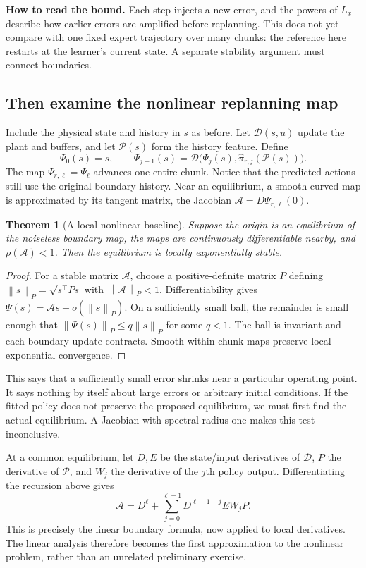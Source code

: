 \documentclass[12 pt]{article}        	%
\newtheorem{theorem}{Theorem}[section]
\theoremstyle{definition}
\newcommand{\norm}[1]{\left\|#1\right\|}
\begin{document}
\textbf{How to read the bound.} Each step injects a new error, and the powers of $L_x$ describe how earlier errors are amplified before replanning. This does not yet compare with one fixed expert trajectory over many chunks: the reference here restarts at the learner's current state. A separate stability argument must connect boundaries.

\subsection{Then examine the nonlinear replanning map}
Include the physical state and history in $s$ as before. Let $\mathscr D(s,u)$ update the plant and buffers, and let $\mathscr P(s)$ form the history feature. Define
\[
\Psi_0(s)=s,\qquad
\Psi_{j+1}(s)=\mathscr D\bigl(\Psi_j(s),\widehat\pi_{r,j}(\mathscr P(s))\bigr).
\]
The map $\Psi_{r,\ell}=\Psi_\ell$ advances one entire chunk. Notice that the predicted actions still use the original boundary history. Near an equilibrium, a smooth curved map is approximated by its tangent matrix, the Jacobian $\mathcal A=D\Psi_{r,\ell}(0)$.

\begin{theorem}[A local nonlinear baseline]
Suppose the origin is an equilibrium of the noiseless boundary map, the maps are continuously differentiable nearby, and $\rho(\mathcal A)<1$. Then the equilibrium is locally exponentially stable.
\end{theorem}
\begin{proof}
For a stable matrix $\mathcal A$, choose a positive-definite matrix $P$ defining $\norm{s}_P=\sqrt{s^\top Ps}$ with $\norm{\mathcal A}_P<1$. Differentiability gives $\Psi(s)=\mathcal As+o(\norm{s}_P)$. On a sufficiently small ball, the remainder is small enough that $\norm{\Psi(s)}_P\le q\norm{s}_P$ for some $q<1$. The ball is invariant and each boundary update contracts. Smooth within-chunk maps preserve local exponential convergence.
\end{proof}

This says that a sufficiently small error shrinks near a particular operating point. It says nothing by itself about large errors or arbitrary initial conditions. If the fitted policy does not preserve the proposed equilibrium, we must first find the actual equilibrium. A Jacobian with spectral radius one makes this test inconclusive.

At a common equilibrium, let $D,E$ be the state/input derivatives of $\mathscr D$, $P$ the derivative of $\mathscr P$, and $W_j$ the derivative of the $j$th policy output. Differentiating the recursion above gives
\[
\mathcal A=D^\ell+\sum_{j=0}^{\ell-1}D^{\ell-1-j}EW_jP.
\]
This is precisely the linear boundary formula, now applied to local derivatives. The linear analysis therefore becomes the first approximation to the nonlinear problem, rather than an unrelated preliminary exercise.
\end{document}
